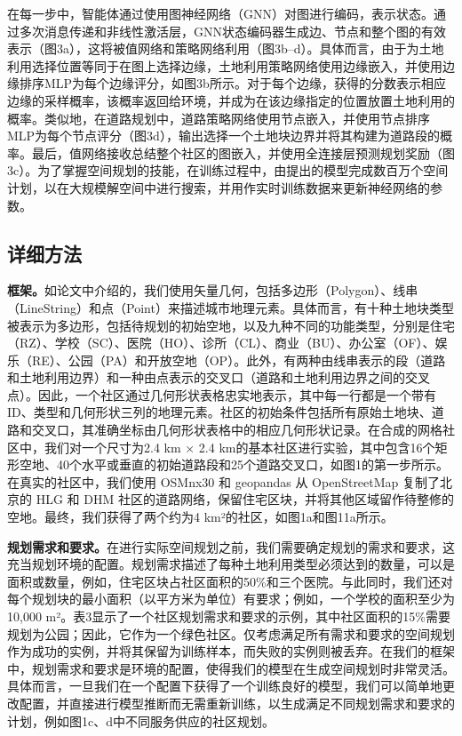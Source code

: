 在每一步中，智能体通过使用图神经网络（GNN）对图进行编码，表示状态。通过多次消息传递和非线性激活层，GNN状态编码器生成边、节点和整个图的有效表示（图3a），这将被值网络和策略网络利用（图3b–d）。具体而言，由于为土地利用选择位置等同于在图上选择边缘，土地利用策略网络使用边缘嵌入，并使用边缘排序MLP为每个边缘评分，如图3b所示。对于每个边缘，获得的分数表示相应边缘的采样概率，该概率返回给环境，并成为在该边缘指定的位置放置土地利用的概率。类似地，在道路规划中，道路策略网络使用节点嵌入，并使用节点排序MLP为每个节点评分（图3d），输出选择一个土地块边界并将其构建为道路段的概率。最后，值网络接收总结整个社区的图嵌入，并使用全连接层预测规划奖励（图3c）。为了掌握空间规划的技能，在训练过程中，由提出的模型完成数百万个空间计划，以在大规模解空间中进行搜索，并用作实时训练数据来更新神经网络的参数。

\subsection{详细方法}

\textbf{框架。}如论文中介绍的，我们使用矢量几何，包括多边形（Polygon）、线串（LineString）和点（Point）来描述城市地理元素。具体而言，有十种土地块类型被表示为多边形，包括待规划的初始空地，以及九种不同的功能类型，分别是住宅（RZ）、学校（SC）、医院（HO）、诊所（CL）、商业（BU）、办公室（OF）、娱乐（RE）、公园（PA）和开放空地（OP）。此外，有两种由线串表示的段（道路和土地利用边界）和一种由点表示的交叉口（道路和土地利用边界之间的交叉点）。因此，一个社区通过几何形状表格忠实地表示，其中每一行都是一个带有ID、类型和几何形状三列的地理元素。社区的初始条件包括所有原始土地块、道路和交叉口，其准确坐标由几何形状表格中的相应几何形状记录。在合成的网格社区中，我们对一个尺寸为2.4 km × 2.4 km的基本社区进行实验，其中包含16个矩形空地、40个水平或垂直的初始道路段和25个道路交叉口，如图1的第一步所示。在真实的社区中，我们使用 OSMnx30 和 geopandas 从 OpenStreetMap 复制了北京的 HLG 和 DHM 社区的道路网络，保留住宅区块，并将其他区域留作待整修的空地。最终，我们获得了两个约为4 km²的社区，如图1a和图11a所示。

\textbf{规划需求和要求。}在进行实际空间规划之前，我们需要确定规划的需求和要求，这充当规划环境的配置。规划需求描述了每种土地利用类型必须达到的数量，可以是面积或数量，例如，住宅区块占社区面积的50\%和三个医院。与此同时，我们还对每个规划块的最小面积（以平方米为单位）有要求；例如，一个学校的面积至少为10,000 m²。表3显示了一个社区规划需求和要求的示例，其中社区面积的15\%需要规划为公园；因此，它作为一个绿色社区。仅考虑满足所有需求和要求的空间规划作为成功的实例，并将其保留为训练样本，而失败的实例则被丢弃。在我们的框架中，规划需求和要求是环境的配置，使得我们的模型在生成空间规划时非常灵活。具体而言，一旦我们在一个配置下获得了一个训练良好的模型，我们可以简单地更改配置，并直接进行模型推断而无需重新训练，以生成满足不同规划需求和要求的计划，例如图1c、d中不同服务供应的社区规划。

